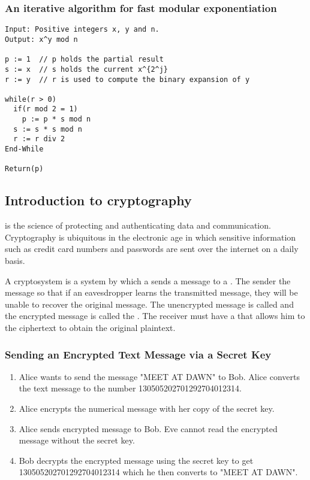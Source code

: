 \subsubsection*{An iterative algorithm for fast modular exponentiation}
\begin{lstlisting}
Input: Positive integers x, y and n.
Output: x^y mod n

p := 1  // p holds the partial result
s := x  // s holds the current x^{2^j}
r := y  // r is used to compute the binary expansion of y

while(r > 0)
  if(r mod 2 = 1)
    p := p * s mod n
  s := s * s mod n
  r := r div 2
End-While

Return(p)
\end{lstlisting}

\subsection{Introduction to cryptography}
 is the science of protecting and authenticating data and communication. Cryptography is ubiquitous in the electronic age in which sensitive information such as credit card numbers and passwords are sent over the internet on a daily basis.

A cryptosystem is a system by which a  sends a message to a . The sender  the message so that if an eavesdropper learns the transmitted message, they will be unable to recover the original message. The unencrypted message is called  and the encrypted message is called the . The receiver must have a  that allows him to  the ciphertext to obtain the original plaintext.

\subsubsection*{Sending an Encrypted Text Message via a Secret Key}
\begin{enumerate}
  \item Alice wants to send the message "MEET AT DAWN" to Bob. Alice converts the text message to the number 130505202701292704012314.
  \item Alice encrypts the numerical message with her copy of the secret key.
  \item Alice sends encrypted message to Bob. Eve cannot read the encrypted message without the secret key.
  \item Bob decrypts the encrypted message using the secret key to get 130505202701292704012314 which he then converts to "MEET AT DAWN".
\end{enumerate}

